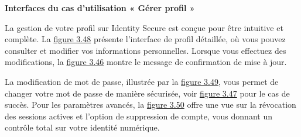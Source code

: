 \textbf{Interfaces du cas d'utilisation « Gérer profil »}

La gestion de votre profil sur Identity Secure est conçue pour être intuitive et complète. La \hyperref[fig:3.41]{figure 3.48} présente l'interface de profil détaillée, où vous pouvez consulter et modifier vos informations personnelles. Lorsque vous effectuez des modifications, la \hyperref[fig:3.41]{figure 3.46} montre le message de confirmation de mise à jour.

La modification de mot de passe, illustrée par la \hyperref[fig:3.41]{figure 3.49}, vous permet de changer votre mot de passe de manière sécurisée, voir \hyperref[fig:3.41]{figure 3.47} pour le cas de succès. Pour les paramètres avancés, la \hyperref[fig:3.41]{figure 3.50} offre une vue sur la révocation des sessions actives et l'option de suppression de compte, vous donnant un contrôle total sur votre identité numérique.


